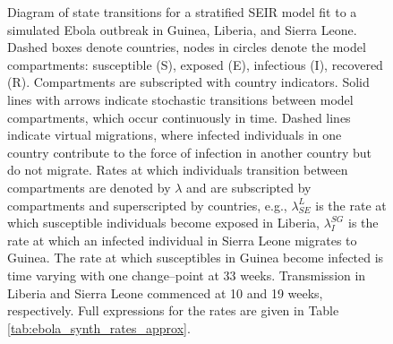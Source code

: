 \begin{figure}[htbp]
\begin{fullpage}
{
		}
		\caption[Diagram of a stratified SEIR model with country specific outbreak dynamics and cross--country virtual transmission.]{Diagram of state transitions for a stratified SEIR model fit to a simulated Ebola outbreak in Guinea, Liberia, and Sierra Leone. Dashed boxes denote countries, nodes in circles denote the model compartments: susceptible (S), exposed (E), infectious (I), recovered (R). Compartments  are subscripted with country indicators. Solid lines with arrows indicate stochastic transitions between model compartments, which occur continuously in time. Dashed lines indicate virtual migrations, where infected individuals in one country contribute to the force of infection in another country but do not migrate. Rates at which individuals transition between compartments are denoted by $ \lambda $ and are subscripted by compartments and superscripted by countries, e.g., $ \lambda_{SE}^L $ is the rate at which susceptible individuals become exposed in Liberia, $ \lambda_I^{SG} $ is the rate at which an infected individual in Sierra Leone migrates to Guinea. The rate at which susceptibles in Guinea become infected is time varying with one change--point at 33 weeks. Transmission in Liberia and Sierra Leone commenced at 10 and 19 weeks, respectively. Full expressions for the rates are given in Table \ref{tab:ebola_synth_rates_approx}.}
		\label{fig:stratified_seir_approx_diag}
	\end{fullpage}
\end{figure}

